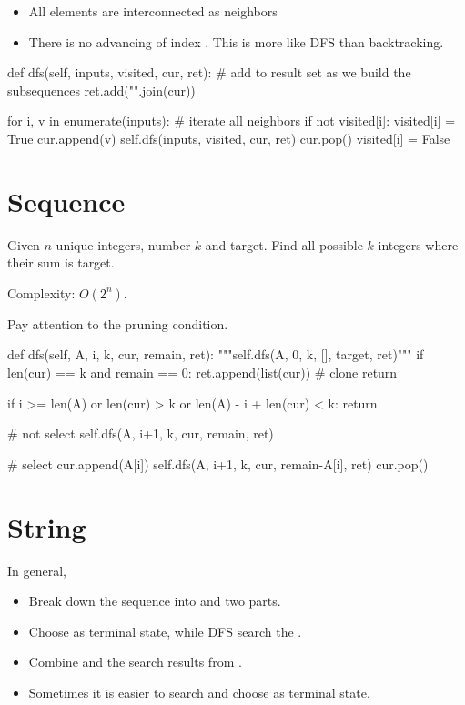 \begin{itemize}
\item All elements are interconnected as neighbors
\item There is no advancing of index . This is more like DFS than backtracking.
\end{itemize}
\begin{python}
def dfs(self, inputs, visited, cur, ret):
    # add to result set as we build the subsequences
    ret.add("".join(cur))

    for i, v in enumerate(inputs):
        # iterate all neighbors
        if not visited[i]:
            visited[i] = True
            cur.append(v)
            self.dfs(inputs, visited, cur, ret)
            cur.pop()
            visited[i] = False
\end{python}

\section{Sequence}
 Given $n$ unique integers, number $k$ and target. Find all possible $k$ integers where their sum is target. 

Complexity: $O(2^n)$.

Pay attention to the pruning condition.

\begin{python}
def dfs(self, A, i, k, cur, remain, ret):
    """self.dfs(A, 0, k, [], target, ret)"""
    if len(cur) == k and remain == 0:
        ret.append(list(cur))  # clone 
        return

    if i >= len(A) or len(cur) > k 
       or len(A) - i + len(cur) < k:
        return
	
	# not select 
    self.dfs(A, i+1, k, cur, remain, ret)
    
    # select
    cur.append(A[i])
    self.dfs(A, i+1, k, cur, remain-A[i], ret)
    cur.pop()
\end{python}


\section{String}
In general, 
\begin{itemize}
\item Break down the sequence into  and  two parts. 
\item Choose  as terminal state, while DFS search the . 
\item Combine  and the search results from .
\item Sometimes it is easier to search  and choose  as terminal state. 
\end{itemize}
